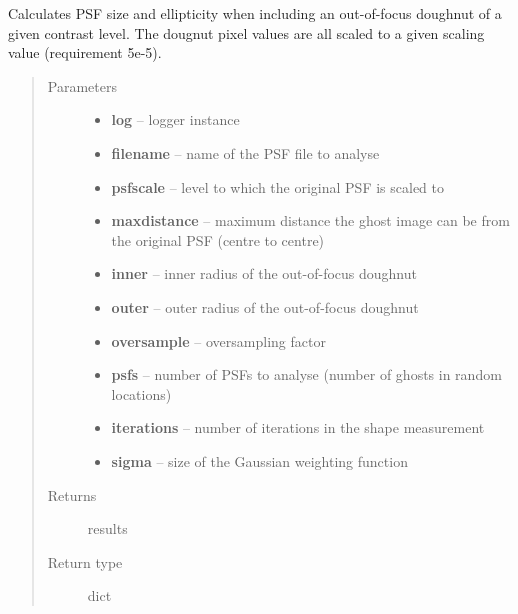 \documentclass[a4paper,11pt,english]{sphinxmanual}
\begin{document}
\begin{fulllineitems}
\label{reduction:analysis.analyseGhosts.analyseOutofFocusImpact}
Calculates PSF size and ellipticity when including an out-of-focus doughnut of a given contrast level.
The dougnut pixel values are all scaled to a given scaling value (requirement 5e-5).
\begin{quote}\begin{description}
\item[{Parameters}] \leavevmode\begin{itemize}
\item {} 
\textbf{log} -- logger instance

\item {} 
\textbf{filename} -- name of the PSF file to analyse

\item {} 
\textbf{psfscale} -- level to which the original PSF is scaled to

\item {} 
\textbf{maxdistance} -- maximum distance the ghost image can be from the original PSF (centre to centre)

\item {} 
\textbf{inner} -- inner radius of the out-of-focus doughnut

\item {} 
\textbf{outer} -- outer radius of the out-of-focus doughnut

\item {} 
\textbf{oversample} -- oversampling factor

\item {} 
\textbf{psfs} -- number of PSFs to analyse (number of ghosts in random locations)

\item {} 
\textbf{iterations} -- number of iterations in the shape measurement

\item {} 
\textbf{sigma} -- size of the Gaussian weighting function

\end{itemize}

\item[{Returns}] \leavevmode
results

\item[{Return type}] \leavevmode
dict

\end{description}\end{quote}

\end{fulllineitems}
\end{document}
